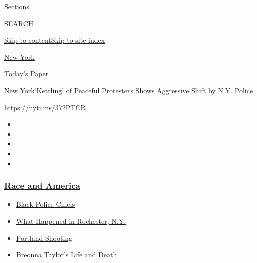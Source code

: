Sections

SEARCH

\protect\hyperlink{site-content}{Skip to
content}\protect\hyperlink{site-index}{Skip to site index}

\href{https://www.nytimes3xbfgragh.onion/section/nyregion}{New York}

\href{https://myaccount.nytimes3xbfgragh.onion/auth/login?response_type=cookie\&client_id=vi}{}

\href{https://www.nytimes3xbfgragh.onion/section/todayspaper}{Today's
Paper}

\href{/section/nyregion}{New York}\textbar{}`Kettling' of Peaceful
Protesters Shows Aggressive Shift by N.Y. Police

\url{https://nyti.ms/372PTCR}

\begin{itemize}
\item
\item
\item
\item
\item
\end{itemize}

\hypertarget{race-and-america}{%
\subsubsection{\texorpdfstring{\href{https://www.nytimes3xbfgragh.onion/news-event/george-floyd-protests-minneapolis-new-york-los-angeles?name=styln-george-floyd\&region=TOP_BANNER\&block=storyline_menu_recirc\&action=click\&pgtype=Article\&impression_id=a10364b0-f4ba-11ea-a6df-cbaea4376604\&variant=undefined}{Race
and America}}{Race and America}}\label{race-and-america}}

\begin{itemize}
\tightlist
\item
  \href{https://www.nytimes3xbfgragh.onion/2020/09/11/us/black-police-chiefs-reform.html?name=styln-george-floyd\&region=TOP_BANNER\&block=storyline_menu_recirc\&action=click\&pgtype=Article\&impression_id=a10364b1-f4ba-11ea-a6df-cbaea4376604\&variant=undefined}{Black
  Police Chiefs}
\item
  \href{https://www.nytimes3xbfgragh.onion/2020/09/04/nyregion/rochester-police-daniel-prude.html?name=styln-george-floyd\&region=TOP_BANNER\&block=storyline_menu_recirc\&action=click\&pgtype=Article\&impression_id=a10364b2-f4ba-11ea-a6df-cbaea4376604\&variant=undefined}{What
  Happened in Rochester, N.Y.}
\item
  \href{https://www.nytimes3xbfgragh.onion/2020/08/30/us/portland-shooting-explained.html?name=styln-george-floyd\&region=TOP_BANNER\&block=storyline_menu_recirc\&action=click\&pgtype=Article\&impression_id=a10364b3-f4ba-11ea-a6df-cbaea4376604\&variant=undefined}{Portland
  Shooting}
\item
  \href{https://www.nytimes3xbfgragh.onion/2020/08/30/us/breonna-taylor-police-killing.html?name=styln-george-floyd\&region=TOP_BANNER\&block=storyline_menu_recirc\&action=click\&pgtype=Article\&impression_id=a10364b4-f4ba-11ea-a6df-cbaea4376604\&variant=undefined}{Breonna
  Taylor's Life and Death}
\end{itemize}

